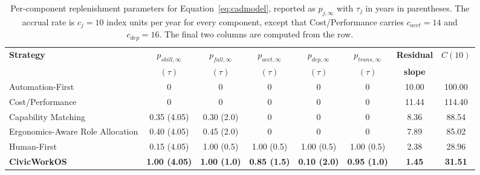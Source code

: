 \documentclass[utf8]{frontiers_suppmat}
\begin{document}
\begin{table}[!htbp]
	\caption{Per-component replenishment parameters for Equation~\eqref{eq:cadmodel}, reported as $p_{j,\infty}$ with $\tau_j$ in years in parentheses. The accrual rate is $c_j=10$ index units per year for every component, except that Cost/Performance carries $c_{acct}=14$ and $c_{dep}=16$. The final two columns are computed from the row.}
	\label{tab:cadparams}
	\footnotesize
	\begin{tabularx}{\textwidth}{@{}Xccccccc@{}}
		\toprule
		\textbf{Strategy} & $p_{skill,\infty}$ & $p_{fall,\infty}$ & $p_{acct,\infty}$ & $p_{dep,\infty}$ & $p_{trans,\infty}$ & \textbf{Residual} & $C(10)$\\
		& $(\tau)$ & $(\tau)$ & $(\tau)$ & $(\tau)$ & $(\tau)$ & \textbf{slope} & \\
		\midrule
		Automation-First & 0 & 0 & 0 & 0 & 0 & 10.00 & 100.00\\
		Cost/Performance & 0 & 0 & 0 & 0 & 0 & 11.44 & 114.40\\
		Capability Matching & 0.35 (4.05) & 0.30 (2.0) & 0 & 0 & 0 & 8.36 & 88.54\\
		Ergonomics-Aware Role Allocation & 0.40 (4.05) & 0.45 (2.0) & 0 & 0 & 0 & 7.89 & 85.02\\
		Human-First & 0.15 (4.05) & 1.00 (0.5) & 1.00 (0.5) & 1.00 (0.5) & 1.00 (0.5) & 2.38 & 28.96\\
		\textbf{CivicWorkOS} & \textbf{1.00 (4.05)} & \textbf{1.00 (1.0)} & \textbf{0.85 (1.5)} & \textbf{0.10 (2.0)} & \textbf{0.95 (1.0)} & \textbf{1.45} & \textbf{31.51}\\
		\bottomrule
	\end{tabularx}
\end{table}
\end{document}

